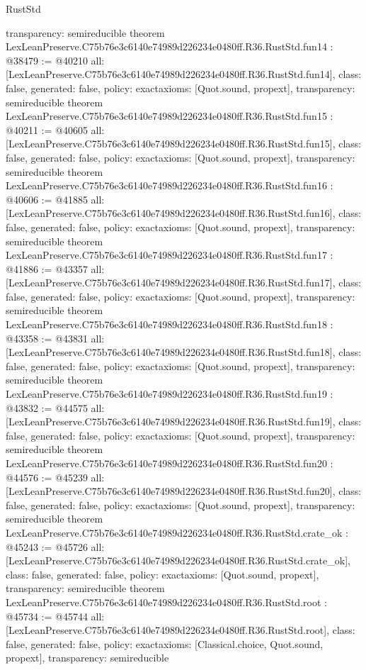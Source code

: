 \begin{lexlean}{RustStd}
\begin{coremodule}
{  transparency: semireducible
}
theorem LexLeanPreserve.C75b76e3c6140e74989d226234e0480ff.R36.RustStd.fun14 : @38479 := @40210 {
  all: [LexLeanPreserve.C75b76e3c6140e74989d226234e0480ff.R36.RustStd.fun14],
  class: false,
  generated: false,
  policy: exact{axioms: [Quot.sound, propext]},
  transparency: semireducible
}
theorem LexLeanPreserve.C75b76e3c6140e74989d226234e0480ff.R36.RustStd.fun15 : @40211 := @40605 {
  all: [LexLeanPreserve.C75b76e3c6140e74989d226234e0480ff.R36.RustStd.fun15],
  class: false,
  generated: false,
  policy: exact{axioms: [Quot.sound, propext]},
  transparency: semireducible
}
theorem LexLeanPreserve.C75b76e3c6140e74989d226234e0480ff.R36.RustStd.fun16 : @40606 := @41885 {
  all: [LexLeanPreserve.C75b76e3c6140e74989d226234e0480ff.R36.RustStd.fun16],
  class: false,
  generated: false,
  policy: exact{axioms: [Quot.sound, propext]},
  transparency: semireducible
}
theorem LexLeanPreserve.C75b76e3c6140e74989d226234e0480ff.R36.RustStd.fun17 : @41886 := @43357 {
  all: [LexLeanPreserve.C75b76e3c6140e74989d226234e0480ff.R36.RustStd.fun17],
  class: false,
  generated: false,
  policy: exact{axioms: [Quot.sound, propext]},
  transparency: semireducible
}
theorem LexLeanPreserve.C75b76e3c6140e74989d226234e0480ff.R36.RustStd.fun18 : @43358 := @43831 {
  all: [LexLeanPreserve.C75b76e3c6140e74989d226234e0480ff.R36.RustStd.fun18],
  class: false,
  generated: false,
  policy: exact{axioms: [Quot.sound, propext]},
  transparency: semireducible
}
theorem LexLeanPreserve.C75b76e3c6140e74989d226234e0480ff.R36.RustStd.fun19 : @43832 := @44575 {
  all: [LexLeanPreserve.C75b76e3c6140e74989d226234e0480ff.R36.RustStd.fun19],
  class: false,
  generated: false,
  policy: exact{axioms: [Quot.sound, propext]},
  transparency: semireducible
}
theorem LexLeanPreserve.C75b76e3c6140e74989d226234e0480ff.R36.RustStd.fun20 : @44576 := @45239 {
  all: [LexLeanPreserve.C75b76e3c6140e74989d226234e0480ff.R36.RustStd.fun20],
  class: false,
  generated: false,
  policy: exact{axioms: [Quot.sound, propext]},
  transparency: semireducible
}
theorem LexLeanPreserve.C75b76e3c6140e74989d226234e0480ff.R36.RustStd.crate_ok : @45243 := @45726 {
  all: [LexLeanPreserve.C75b76e3c6140e74989d226234e0480ff.R36.RustStd.crate_ok],
  class: false,
  generated: false,
  policy: exact{axioms: [Quot.sound, propext]},
  transparency: semireducible
}
theorem LexLeanPreserve.C75b76e3c6140e74989d226234e0480ff.R36.RustStd.root : @45734 := @45744 {
  all: [LexLeanPreserve.C75b76e3c6140e74989d226234e0480ff.R36.RustStd.root],
  class: false,
  generated: false,
  policy: exact{axioms: [Classical.choice, Quot.sound, propext]},
  transparency: semireducible
}


\end{coremodule}
\end{lexlean}
